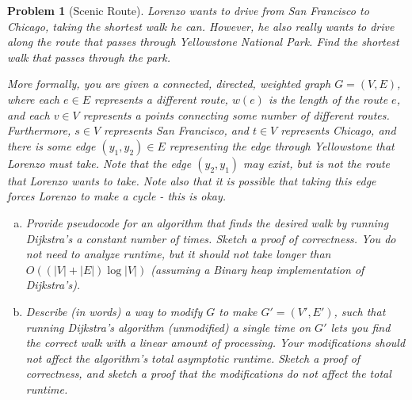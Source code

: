 \documentclass[10pt]{article}
\newtheorem{problem}{\sc\color{cit}Problem}
\begin{document}
\begin{problem}[Scenic Route] Lorenzo wants to drive from San Francisco to Chicago, taking the shortest walk he can. However, he also really wants to drive along the route that passes through Yellowstone National Park. Find the shortest walk that passes through the park. 

More formally, you are given a connected, directed, weighted graph $G=(V, E)$, where each $e \in E$ represents a different route, $w(e)$ is the length of the route $e$, and each $v \in V$ represents a points connecting some number of different routes. Furthermore, $s \in V$ represents San Francisco, and $t \in V$ represents Chicago, and there is some edge $(y_1, y_2) \in E$ representing the edge through Yellowstone that Lorenzo must take. Note that the edge $(y_2, y_1)$ may exist, but is not the route that Lorenzo wants to take.  Note also that it is possible that taking this edge forces Lorenzo to make a cycle - this is okay.

\begin{enumerate}[(a)]
    \item Provide pseudocode for an algorithm that finds the desired walk by running Dijkstra's a constant number of times. Sketch a proof of correctness. You do not need to analyze runtime, but it should not take longer than $O((|V|+|E|)\log|V|)$ (assuming a Binary heap implementation of Dijkstra's). 
    \item Describe (in words) a way to modify $G$ to make $G' = (V', E')$, such that running Dijkstra's algorithm (unmodified) a single time on $G'$ lets you find the correct walk with a linear amount of processing. Your modifications should not affect the algorithm's total asymptotic runtime. Sketch a proof of correctness, and sketch a proof that the modifications do not affect the total runtime. 
\end{enumerate}

\end{problem}
\end{document}
